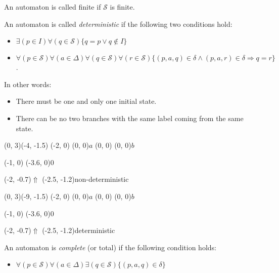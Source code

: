 \documentclass{article}
\begin{document}
\begin{definition}[Finiteness] \label{def:fin}
An automaton is called finite if $\mathcal{S}$ is finite.
\end{definition}

\begin{definition}[Determinism] \label{def:det}
An automaton is called \emph{deterministic} if the following two conditions 
hold:
\begin{itemize}
\item $\exists (p \in I) \forall (q  \in \mathcal{S})
\{q = p \lor q \notin I\}$
\item $\forall (p \in \mathcal{S}) \forall (a \in \Delta)
\forall (q \in \mathcal{S}) \forall (r \in \mathcal{S})
\{(p, a, q) \in \delta \land (p, a, r) \in \delta \Rightarrow q = r\}$.
\end{itemize}
\end{definition}

In other words:
\begin{itemize}
\item There must be one and only one initial state.
\item There can be no two branches with the same label coming from the same 
  state.
\end{itemize}
\begin{graph}(0, 3)(-4, -1.5)
  (-2, 0) (0, 0){$a$}
  (0, 0) (0, 0){$b$}

  (-1, 0) \freetext(-3.6, 0){0}
   

  \freetext(-2, -0.7){$\Uparrow$}
  \freetext(-2.5, -1.2){non-deterministic}
\end{graph}
\begin{graph}(0, 3)(-9, -1.5)
  (-2, 0) (0, 0){$a$}
  (0, 0) (0, 0){$b$}

  (-1, 0) \freetext(-3.6, 0){0}
   

  \freetext(-2, -0.7){$\Uparrow$}
  \freetext(-2.5, -1.2){deterministic}
\end{graph}

\begin{definition}[Completeness] \label{def:complete}
An automaton is \emph{complete} (or total) if the following condition holds:
\begin{itemize}
\item $\forall (p \in \mathcal{S}) \forall (a \in \Delta)
\exists (q \in \mathcal{S}) \{(p, a, q) \in \delta\}$
\end{itemize}
\end{definition}
\end{document}
